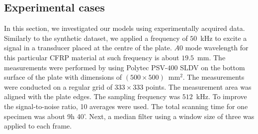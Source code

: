 \begin{sloppypar}
	\subsection{Experimental cases}
	In this section, we investigated our models using experimentally acquired data.
	Similarly to the synthetic dataset, we applied a frequency of \(50\)~kHz to excite a signal in a transducer placed at the centre of the plate. 
	\(A0\) mode wavelength for this particular CFRP material at such frequency is about \(19.5\)~mm. 
	The measurements were performed by using Polytec PSV-\(400\) SLDV on the 
	bottom surface of the plate with dimensions of 
	\((500\times500)\)~mm\(^{2}\). 
	The measurements were conducted on a regular grid of \(333\times333\) points. 
	The measurement area was aligned with the plate edges.
	The sampling frequency was \(512\)~kHz.
	To improve the signal-to-noise ratio, 10 averages were used.
	The total scanning time for one specimen was about 9h 40'.
	Next, a median filter using a window size of three was applied to each frame. 


\end{sloppypar}

